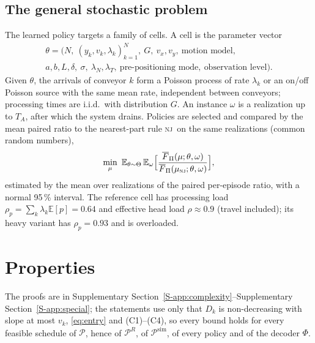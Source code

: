 \documentclass[11pt,a4paper]{article}
\theoremstyle{plain}
\theoremstyle{definition}
\theoremstyle{remark}
\newcommand{\nj}{\textsc{nj}}
\newcommand{\Pb}{\mathcal{P}}
\newcommand{\Psim}{\Pb^{\mathrm{sim}}}
\newcommand{\Fpi}{\overline F_\Pi}
\newcommand{\Supp}[1]{Supplementary Section~\ref{S-#1}}
\begin{document}
\subsection{The general stochastic problem}\label{sec:general}
The learned policy targets a family of cells. A cell is the parameter vector
\begin{multline*}
\theta=\bigl(N,\ (y_k,v_k,\lambda_k)_{k=1}^N,\ G,\ v_x,v_y,\ \text{motion model},\\
a,b,L,\delta,\ \sigma,\ \lambda_N,\lambda_T,\ \text{pre-positioning mode},\ \text{observation level}\bigr).
\end{multline*}
Given $\theta$, the arrivals of conveyor $k$ form a Poisson process of rate $\lambda_k$ or
an on/off Poisson source with the same mean rate, independent between conveyors; processing
times are i.i.d.\ with distribution $G$. An instance $\omega$ is a realization up to $T_A$,
after which the system drains. Policies are selected and compared by the mean paired ratio
to the nearest-part rule \nj\ on the same realizations (common random numbers),
\begin{equation}\label{eq:general}
\min_\mu\ \mathbb E_{\theta\sim\Theta}\,\mathbb E_\omega\Bigl[\frac{\Fpi(\mu;\theta,\omega)}{\Fpi(\mu_{\nj};\theta,\omega)}\Bigr],
\end{equation}
estimated by the mean over realizations of the paired per-episode ratio, with a normal
95\,\% interval. The reference cell has processing load $\rho_p=\sum_k\lambda_k\mathbb E[p]=0.64$
and effective head load $\rho\approx0.9$ (travel included); its heavy variant has
$\rho_p=0.93$ and is overloaded.

\section{Properties}\label{sec:properties}
The proofs are in \Supp{app:complexity}--\Supp{app:special}; the statements use only
that $D_k$ is non-decreasing with slope at most $v_k$, \eqref{eq:entry} and (C1)--(C4), so
every bound holds for every feasible schedule of $\Pb$, hence of $\Pb^R$, of $\Psim$, of
every policy and of the decoder $\Phi$.
\end{document}

